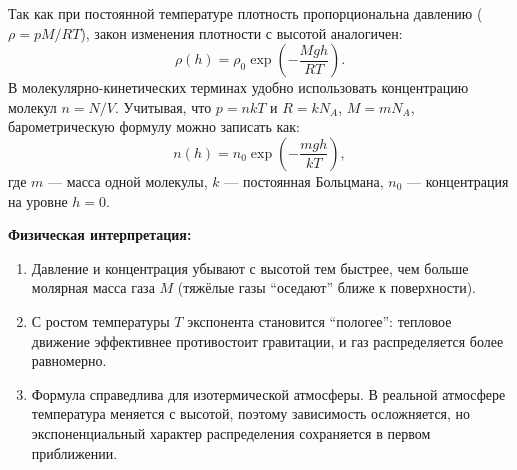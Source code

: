 \begin{property}
Так как при постоянной температуре плотность пропорциональна давлению ($\rho = pM/RT$), закон изменения плотности с высотой аналогичен:
\begin{equation}
    \rho(h) = \rho_0 \exp\left(-\frac{Mgh}{RT}\right).
\end{equation}
В молекулярно-кинетических терминах удобно использовать концентрацию молекул $n = N/V$. Учитывая, что $p = nkT$ и $R = kN_A$, $M = mN_A$, барометрическую формулу можно записать как:
\begin{equation}
    n(h) = n_0 \exp\left(-\frac{mgh}{kT}\right), \label{eq:barometric_n}
\end{equation}
где $m$ --- масса одной молекулы, $k$ --- постоянная Больцмана, $n_0$ --- концентрация на уровне $h=0$.
\end{property}

\begin{remark}
\textbf{Физическая интерпретация:}
\begin{enumerate}
    \item Давление и концентрация убывают с высотой тем быстрее, чем больше молярная масса газа $M$ (тяжёлые газы ``оседают'' ближе к поверхности).
    \item С ростом температуры $T$ экспонента становится ``пологее'': тепловое движение эффективнее противостоит гравитации, и газ распределяется более равномерно.
    \item Формула справедлива для изотермической атмосферы. В реальной атмосфере температура меняется с высотой, поэтому зависимость осложняется, но экспоненциальный характер распределения сохраняется в первом приближении.
\end{enumerate}
\end{remark}

